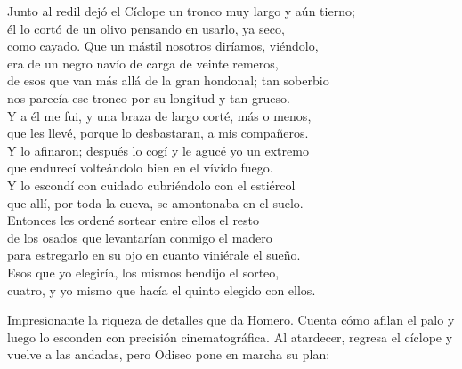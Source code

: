 \begin{versocita}
Junto al redil dejó el Cíclope un tronco muy largo y aún tierno;\\
él lo cortó de un olivo pensando en usarlo, ya seco,\\
como cayado. Que un mástil nosotros diríamos, viéndolo,\\
era de un negro navío de carga de veinte remeros,\\
de esos que van más allá de la gran hondonal; tan soberbio\\
nos parecía ese tronco por su longitud y tan grueso.\\
Y a él me fui, y una braza de largo corté, más o menos,\\
que les llevé, porque lo desbastaran, a mis compañeros.\\
Y lo afinaron; después lo cogí y le agucé yo un extremo\\
que endurecí volteándolo bien en el vívido fuego.\\
Y lo escondí con cuidado cubriéndolo con el estiércol\\
que allí, por toda la cueva, se amontonaba en el suelo.\\
Entonces les ordené sortear entre ellos el resto\\
de los osados que levantarían conmigo el madero\\
para estregarlo en su ojo en cuanto viniérale el sueño.\\
Esos que yo elegiría, los mismos bendijo el sorteo,\\
cuatro, y yo mismo que hacía el quinto elegido con ellos.
\end{versocita}

Impresionante la riqueza de detalles que da Homero. Cuenta cómo afilan el palo y luego lo esconden con precisión cinematográfica. Al atardecer, regresa el cíclope y vuelve a las andadas, pero Odiseo pone en marcha su plan:

